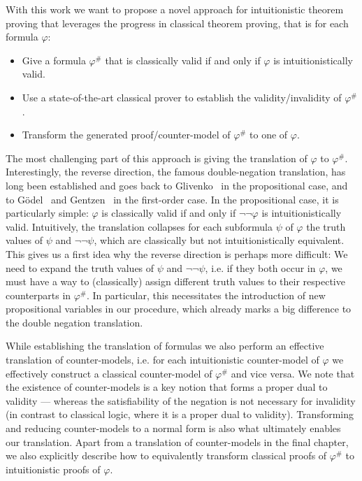 \documentclass{article}
\begin{document}
	With this work we want to propose a novel approach for intuitionistic theorem proving that leverages the progress in classical theorem proving, that is for each formula $\varphi$:
	\begin{itemize}
		\item Give a formula $\varphi^\#$ that is classically valid if and only if $\varphi$ is intuitionistically valid.
		\item Use a state-of-the-art classical prover to establish the validity/invalidity of $\varphi^\#$.
		\item Transform the generated proof/counter-model of $\varphi^\#$ to one of $\varphi$.
	\end{itemize}
	The most challenging part of this approach is giving the translation of $\varphi$ to $\varphi^\#$.
	Interestingly, the reverse direction, the famous double-negation translation, has long been established and goes back to Glivenko~\cite{glivenko1929quelques} in the propositional case, and to G\"odel~\cite{godel1933intuitionistischen} and Gentzen~\cite{gentzen1936widerspruchsfreiheit} in the first-order case. In the propositional case, it is particularly simple: $\varphi$ is classically valid if and only if $\neg\neg\varphi$ is intuitionistically valid. Intuitively, the translation collapses for each subformula $\psi$ of $\varphi$ the truth values of $\psi$ and $\neg\neg\psi$, which are classically but not intuitionistically equivalent. This gives us a first idea why the reverse direction is perhaps more difficult: We need to expand the truth values of $\psi$ and $\neg\neg\psi$, i.e. if they both occur in $\varphi$, we must have a way to (classically) assign different truth values to their respective counterparts in $\varphi^\#$. In particular, this necessitates the introduction of new propositional variables in our procedure, which already marks a big difference to the double negation translation.
	
	While establishing the translation of formulas we also perform an effective translation of counter-models, i.e. for each intuitionistic counter-model of $\varphi$ we effectively construct a classical counter-model of $\varphi^\#$ and vice versa.
	We note that the existence of counter-models is a key notion that forms a proper dual to validity --- whereas the satisfiability of the negation is not necessary for invalidity (in contrast to classical logic, where it is a proper dual to validity).
	Transforming and reducing counter-models to a normal form is also what ultimately enables our translation. Apart from a translation of counter-models in the final chapter, we also explicitly describe how to equivalently transform classical proofs of $\varphi^\#$ to intuitionistic proofs of $\varphi$.
	
\end{document}
